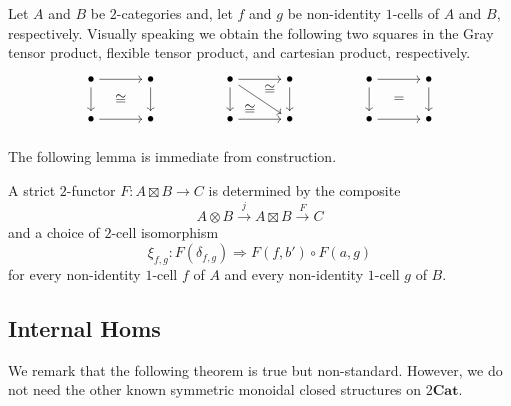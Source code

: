 \documentclass{tac}
\begin{document}
Let $A$ and $B$ be $2$-categories and, let $f$ and $g$ be non-identity $1$-cells of $A$ and $B$, respectively. Visually speaking we obtain the following two squares in the Gray tensor product, flexible tensor product, and cartesian product, respectively.
\[
\begin{tikzpicture}

\node (a1) at (0,1) {$\bullet$};
\node (b1) at (1.5,1) {$\bullet$};
\node (c1) at (0,0) {$\bullet$};
\node (d1) at (1.5,0) {$\bullet$};

\draw[->] (a1) --(b1);
\draw[->] (a1)--(c1);
\draw[->] (b1)--(d1);
\draw[->] (c1)--(d1);

\node at (0.75,0.5) {$\cong$};


\node (a2) at (3.5,1) {$\bullet$};
\node (b2) at (5,1) {$\bullet$};
\node (c2) at (3.5,0) {$\bullet$};
\node (d2) at (5,0) {$\bullet$};

\draw[->] (a2)--(b2);
\draw[->] (a2)--(c2);
\draw[->] (b2)--(d2);
\draw[->] (c2)--(d2);

\draw[->] (a2)--(d2);

\node at (4.5,0.75) {$\cong$};

\node at (4,0.25) {$\cong$};


\node (a3) at (7,1) {$\bullet$};
\node (b3) at (8.5,1) {$\bullet$};
\node (c3) at (7,0) {$\bullet$};
\node (d3) at (8.5,0) {$\bullet$};

\draw[->] (a3)--(b3);
\draw[->] (a3)--(c3);
\draw[->] (b3)--(d3);
\draw[->] (c3)--(d3);

\node at (7.75,0.5) {$=$};

\end{tikzpicture}
\]

The following lemma is immediate from construction.

\begin{lemma}\label{uni_prop_of_flex_prod}
A strict $2$-functor $F:A\boxtimes B\to C$ is determined by the composite
\[
A\otimes B\xrightarrow{j}A\boxtimes B\xrightarrow{F}C
\]
and a choice of $2$-cell isomorphism
\[
\xi_{f,g}:F(\delta_{f,g})\Rightarrow F(f,b')\circ F(a,g)
\]
for every non-identity $1$-cell $f$ of $A$ and every non-identity $1$-cell $g$ of $B$.
\end{lemma}

\subsection*{Internal Homs}
We remark that the following theorem is true but non-standard. However, we do not need the other known symmetric monoidal closed structures on $2\mathbf{Cat}$.
\end{document}
